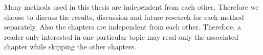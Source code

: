 Many methods used in this thesis are independent from each other. Therefore we
choose to discuss the results, discussion and future research for each method
separately.  Also the chapters are independent from each other. Therefore, a
reader only interested in one particular topic may read only the associated
chapter while skipping the other chapters.



